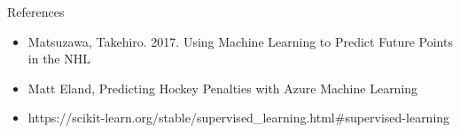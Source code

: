 \begin{frame}{References}
    \begin{itemize}
       \item Matsuzawa, Takehiro. 2017. Using Machine Learning to Predict Future Points in the NHL
       \item Matt Eland, Predicting Hockey Penalties with Azure Machine Learning
       \item https://scikit-learn.org/stable/supervised_learning.html#supervised-learning
    \end{itemize}
\end{frame}  
